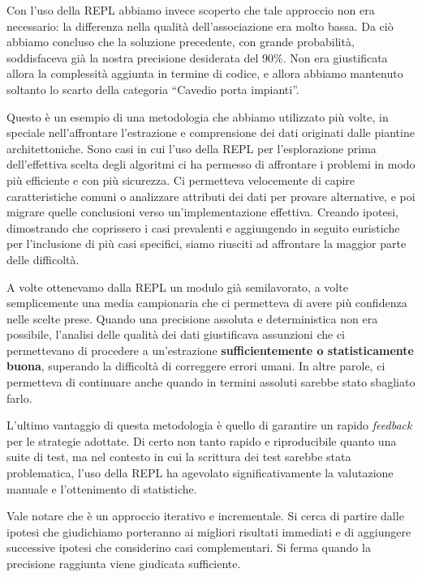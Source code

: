 \documentclass[12pt]{report}
\begin{document}
Con l'uso della REPL abbiamo invece scoperto che tale approccio non era
necessario: la differenza nella qualità dell'associazione era molto
bassa. Da ciò abbiamo concluso che la soluzione precedente, con grande
probabilità, soddisfaceva già la nostra precisione desiderata del 90\%.
Non era giustificata allora la complessità aggiunta in termine di 
codice, e allora abbiamo mantenuto soltanto lo scarto della 
categoria ``Cavedio porta impianti''.

Questo è un esempio di una metodologia che abbiamo utilizzato più volte, in
speciale nell'affrontare l'estrazione e comprensione dei dati originati
dalle piantine architettoniche.
Sono casi in cui l'uso della REPL per l'esplorazione prima
dell'effettiva scelta degli algoritmi ci ha permesso
di affrontare i problemi in modo più efficiente e con più
sicurezza. Ci permetteva velocemente di capire caratteristiche comuni
o analizzare attributi dei dati per provare alternative, e poi migrare
quelle conclusioni verso un'implementazione effettiva. Creando
ipotesi, dimostrando che coprissero i casi prevalenti e aggiungendo in
seguito euristiche per l'inclusione di più casi specifici, siamo riusciti ad
affrontare la maggior parte delle difficoltà.

A volte ottenevamo dalla REPL un modulo già semilavorato, a volte
semplicemente una media campionaria che ci permetteva di avere più
confidenza nelle scelte prese.
Quando una precisione assoluta e deterministica non era possibile,
l'analisi delle qualità dei dati giustificava assunzioni che ci
permettevano di procedere a un'estrazione \textbf{sufficientemente o
statisticamente buona}, superando la difficoltà di correggere errori
umani. In altre parole, ci permetteva di continuare anche quando in
termini assoluti sarebbe stato sbagliato farlo.

L'ultimo vantaggio di questa metodologia è quello di garantire un
rapido \textit{feedback} per le strategie adottate. Di certo non tanto
rapido e riproducibile quanto una suite di test, 
ma nel contesto in cui la scrittura
dei test sarebbe stata problematica, l'uso della REPL ha agevolato
significativamente la valutazione manuale e l'ottenimento di statistiche.

Vale notare che è un approccio iterativo e incrementale. Si cerca di partire
dalle ipotesi che giudichiamo porteranno ai migliori risultati immediati
e di aggiungere successive ipotesi che considerino casi complementari. Si 
ferma quando la precisione raggiunta viene giudicata sufficiente.
\end{document}
